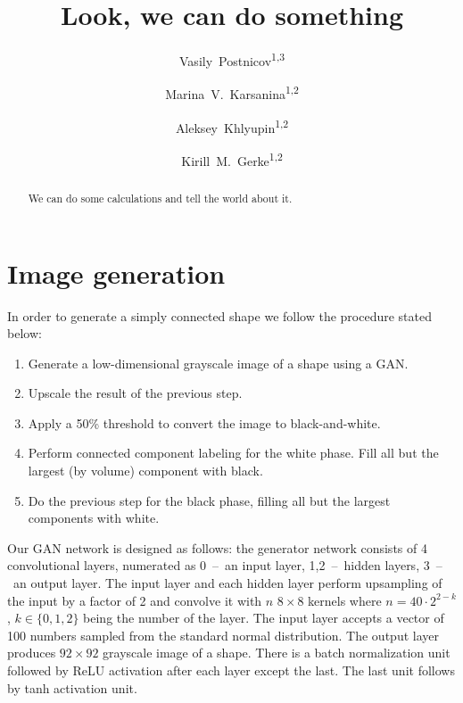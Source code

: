 \documentclass[reprint,amsmath,amssymb,aps,pre,showkeys,showpacs]{revtex4-1}
\newcommand{\highlight}[1]{{\color{red}{#1}}} %
\begin{document}

\author{Vasily~Postnicov\textsuperscript{1,3}}
\author{Marina~V.~Karsanina\textsuperscript{1,2}}
\author{Aleksey~Khlyupin\textsuperscript{1,2}}
\author{Kirill~M.~Gerke\textsuperscript{1,2}}


\title{Look, we can do something}

\begin{abstract}
We can do some calculations and tell the world about it.
\end{abstract}


\maketitle

\section{Image generation}
In order to generate a simply connected shape we follow the procedure stated
below:
\begin{enumerate}
\item Generate a low-dimensional grayscale image of a shape using a
  GAN\cite{goodfellow2020generative}.
\item Upscale the result of the previous step.
\item Apply a 50\% threshold to convert the image to black-and-white.
\item Perform connected component labeling \highlight{how} for the white phase. Fill all but
  the largest (by volume) component with black.
\item Do the previous step for the black phase, filling all but the largest
  components with white.
\end{enumerate}

Our GAN network is designed as follows: the generator network consists of 4
convolutional layers, numerated as 0~--~an input layer, 1,2~--~hidden layers,
3~--~an output layer. The input layer and each hidden layer perform upsampling
of the input by a factor of 2 and convolve it with $n$ $8 \times 8$ kernels
where $n = 40 \cdot 2^{2-k}$, $k \in \{0, 1, 2\}$ being the number of the
layer. The input layer accepts a vector of 100 numbers sampled from the standard
normal distribution. The output layer produces $92 \times 92$ grayscale image of
a shape. There is a batch normalization\cite{ioffe2015batch} unit followed by
ReLU\cite{4082265} activation after each layer except the last. The last unit
follows by tanh activation unit.
\end{document}

